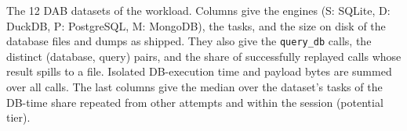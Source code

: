 \begin{table}[tbp]
  \caption{The 12 DAB datasets of the workload. Columns give the engines (S: SQLite, D: DuckDB, P: PostgreSQL, M:
  MongoDB), the tasks, and the size on disk of the database files and dumps as shipped. They also give the
  \texttt{query\_db} calls, the distinct (database, query) pairs, and the share of successfully replayed calls whose
  result spills to a file. Isolated DB-execution time and payload bytes are summed over all calls. The last columns
  give the median over the dataset's tasks of the DB-time share repeated from other attempts and within the session
  (potential tier).}
  \label{tab:datasets}
  \small
  
\end{table}
